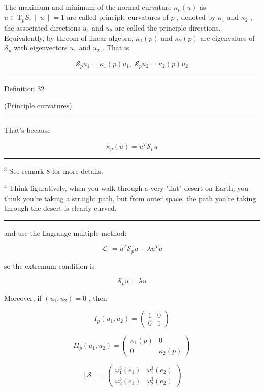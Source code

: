\documentclass[lang=cn,a4paper,11pt,openany,twoside]{elegantbook}
\newcommand{\HRule}{\begin{center}\rule{0.9\linewidth}{0.2mm}\end{center}}
\begin{document}
The maximum and minimum of the normal curvature \({\kappa }_{p}\left( u\right)\) as \(u \in  {\mathrm{T}}_{p}S,\parallel u\parallel  = 1\) are called principle curvatures of \(p\) , denoted by \({\kappa }_{1}\) and \({\kappa }_{2}\) , the associated directions \({u}_{1}\) and \({u}_{2}\) are called the principle directions. Equivalently, by threom of linear algebra, \({\kappa }_{1}\left( p\right)\) and \({\kappa }_{2}\left( p\right)\) are eigenvalues of \({\mathcal{S}}_{p}\) with eigenvectors \({u}_{1}\) and \({u}_{2}\) . That is

\[
{\mathcal{S}}_{p}{u}_{1} = {\kappa }_{1}\left( p\right) {u}_{1},\;{\mathcal{S}}_{p}{u}_{2} = {\kappa }_{2}\left( p\right) {u}_{2}
\]

\HRule

Definition 32

(Principle curvatures)

\HRule

That's because

\[
{\kappa }_{p}\left( u\right)  = {u}^{T}{\mathcal{S}}_{p}u
\]

\HRule

\({}^{3}\) See remark 8 for more details.

\({}^{4}\) Think figuratively, when you walk through a very "flat" desert on Earth, you think you're taking a straight path, but from outer space, the path you're taking through the desert is clearly curved.

\HRule

and use the Lagrange multiple method:

\[
\mathcal{L} :  = {u}^{T}{\mathcal{S}}_{p}u - \lambda {u}^{T}u
\]

so the extremum condition is

\[
{\mathcal{S}}_{p}u = {\lambda u}
\]

Moreover, if \(\left( {{u}_{1},{u}_{2}}\right)  = 0\) , then

\[
{I}_{p}\left( {{u}_{1},{u}_{2}}\right)  = \left( \begin{array}{ll} 1 & 0 \\  0 & 1 \end{array}\right)
\]

\[
I{I}_{p}\left( {{u}_{1},{u}_{2}}\right)  = \left( \begin{matrix} {\kappa }_{1}\left( p\right) & 0 \\  0 & {\kappa }_{2}\left( p\right)  \end{matrix}\right)
\]

\[
\left\lbrack  \mathcal{S}\right\rbrack   = \left( \begin{array}{ll} {\omega }_{1}^{3}\left( {e}_{1}\right) & {\omega }_{1}^{3}\left( {e}_{2}\right) \\  {\omega }_{2}^{3}\left( {e}_{1}\right) & {\omega }_{2}^{3}\left( {e}_{2}\right)  \end{array}\right)
\]
\end{document}
